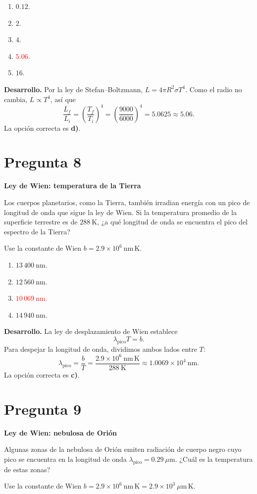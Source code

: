 \documentclass[a4paper,11pt]{article}
\newcommand{\pregunta}[2]{\section*{Pregunta #1}\textbf{#2}\par}
\begin{document}
\begin{enumerate}
    \item $0.12$.
    \item $2$.
    \item $4$.
    \item \textcolor{red}{$5.06$.}
    \item $16$.
\end{enumerate}

\textbf{Desarrollo.} Por la ley de Stefan--Boltzmann, $L=4\pi R^2\sigma T^4$. Como el radio no cambia, $L\propto T^4$, así que
\[
\frac{L_f}{L_i}=\left(\frac{T_f}{T_i}\right)^4
=\left(\frac{9000}{6000}\right)^4=5.0625\approx5.06.
\]
La opción correcta es \textbf{d)}. \parencite[Sec. 9.3, pp. 282--285]{chaparro2026}

\pregunta{8}{Ley de Wien: temperatura de la Tierra}

Los cuerpos planetarios, como la Tierra, también irradian energía con un pico de longitud de onda que sigue la ley de Wien. Si la temperatura promedio de la superficie terrestre es de $288\ \mathrm{K}$, ¿a qué longitud de onda se encuentra el pico del espectro de la Tierra?

Use la constante de Wien $b=2.9\times10^6\ \mathrm{nm\,K}$.

\begin{enumerate}
    \item $13\,400\ \mathrm{nm}$.
    \item $12\,560\ \mathrm{nm}$.
    \item \textcolor{red}{$10\,069\ \mathrm{nm}$.}
    \item $14\,940\ \mathrm{nm}$.
\end{enumerate}

\textbf{Desarrollo.} La ley de desplazamiento de Wien establece
\[
\lambda_{\mathrm{pico}}T=b.
\]
Para despejar la longitud de onda, dividimos ambos lados entre $T$:
\[
\lambda_{\mathrm{pico}}=\frac{b}{T}
=\frac{2.9\times10^6\ \mathrm{nm\,K}}{288\ \mathrm{K}}
\approx1.0069\times10^4\ \mathrm{nm}.
\]
La opción correcta es \textbf{c)}. \parencite[Sec. 9.4, p. 286]{chaparro2026}

\pregunta{9}{Ley de Wien: nebulosa de Orión}

Algunas zonas de la nebulosa de Orión emiten radiación de cuerpo negro cuyo pico se encuentra en la longitud de onda $\lambda_{\mathrm{pico}}=0.29\ \mu\mathrm{m}$. ¿Cuál es la temperatura de estas zonas?

Use la constante de Wien $b=2.9\times10^6\ \mathrm{nm\,K}=2.9\times10^3\ \mu\mathrm{m\,K}$.
\end{document}
